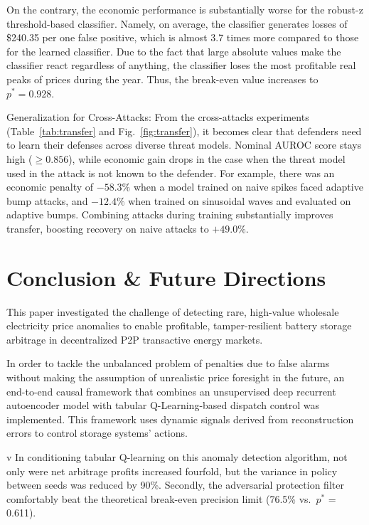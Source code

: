\documentclass[journal]{IEEEtran}
\begin{document}
On the contrary, the economic performance is substantially worse for the robust-z threshold-based classifier. Namely, on average, the classifier generates losses of \$240.35 per one false positive, which is almost 3.7 times more compared to those for the learned classifier. Due to the fact that large absolute values make the classifier react regardless of anything, the classifier loses the most profitable real peaks of prices during the year. Thus, the break-even value increases to $p^* = 0.928$.

Generalization for Cross-Attacks: From the cross-attacks experiments (Table~\ref{tab:transfer} and Fig.~\ref{fig:transfer}), it becomes clear that defenders need to learn their defenses across diverse threat models. Nominal AUROC score stays high ($\geq 0.856$), while economic gain drops in the case when the threat model used in the attack is not known to the defender. For example, there was an economic penalty of $-58.3\%$ when a model trained on naive spikes faced adaptive bump attacks, and $-12.4\%$ when trained on sinusoidal waves and evaluated on adaptive bumps. Combining attacks during training substantially improves transfer, boosting recovery on naive attacks to $+49.0\%$.

\section{Conclusion \& Future Directions}
\label{sec:discussion}

This paper investigated the challenge of detecting rare, high-value wholesale electricity price anomalies to enable profitable, tamper-resilient battery storage arbitrage in decentralized P2P transactive energy markets.

In order to tackle the unbalanced problem of penalties due to false alarms without making the assumption of unrealistic price foresight in the future, an end-to-end causal framework that combines an unsupervised deep recurrent autoencoder model with tabular Q-Learning-based dispatch control was implemented. This framework uses dynamic signals derived from reconstruction errors to control storage systems' actions.

v
In conditioning tabular Q-learning on this anomaly detection algorithm, not only were net arbitrage profits increased fourfold, but the variance in policy between seeds was reduced by 90\%.
Secondly, the adversarial protection filter comfortably beat the theoretical break-even precision limit (76.5\% vs.\ $p^*$ = 0.611).
\end{document}
